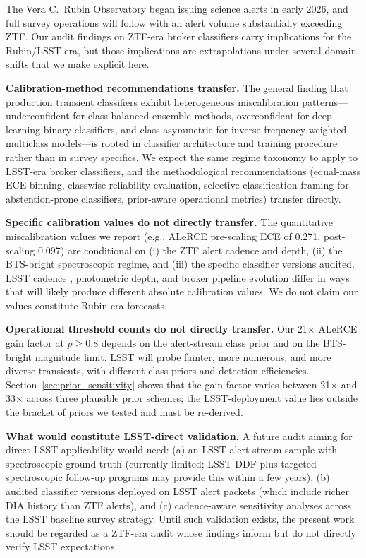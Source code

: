 \documentclass[twocolumn]{aastex631}
\begin{document}
The Vera C.\ Rubin Observatory began issuing science alerts in early 2026,
and full survey operations will follow with an alert volume substantially
exceeding ZTF. Our audit findings on ZTF-era broker classifiers carry
implications for the Rubin/LSST era, but those implications are
extrapolations under several domain shifts that we make explicit here.

\textbf{Calibration-method recommendations transfer.} The general
finding that production transient classifiers exhibit heterogeneous
miscalibration patterns---underconfident for class-balanced ensemble
methods, overconfident for deep-learning binary classifiers, and
class-asymmetric for inverse-frequency-weighted multiclass
models---is rooted in classifier architecture and training procedure
rather than in survey specifics. We expect the same regime taxonomy to
apply to LSST-era broker classifiers, and the methodological
recommendations (equal-mass ECE binning, classwise reliability
evaluation, selective-classification framing for abstention-prone
classifiers, prior-aware operational metrics) transfer directly.

\textbf{Specific calibration values do not directly transfer.} The
quantitative miscalibration values we report (e.g., ALeRCE pre-scaling
ECE of 0.271, post-scaling 0.097) are conditional on (i) the ZTF alert
cadence and depth, (ii) the BTS-bright spectroscopic regime, and (iii)
the specific classifier versions audited. LSST cadence
\citep{ivezic2019}, photometric depth, and broker pipeline
evolution \citep{moller2021,sanchezsaez2021} differ in ways that will
likely produce different absolute calibration values. We do not claim
our values constitute Rubin-era forecasts.

\textbf{Operational threshold counts do not directly transfer.} Our
21$\times$ ALeRCE gain factor at $p \geq 0.8$ depends on the
alert-stream class prior and on the BTS-bright magnitude limit.
LSST will probe fainter, more numerous, and more diverse transients,
with different class priors and detection efficiencies.
Section~\ref{sec:prior_sensitivity} shows that the gain factor varies
between 21$\times$ and 33$\times$ across three plausible prior schemes;
the LSST-deployment value lies outside the bracket of priors we tested
and must be re-derived.

\textbf{What would constitute LSST-direct validation.} A future audit
aiming for direct LSST applicability would need: (a) an LSST alert-stream
sample with spectroscopic ground truth (currently limited; LSST DDF plus
targeted spectroscopic follow-up programs may provide this within a few
years), (b) audited classifier versions deployed on LSST alert packets
(which include richer DIA history than ZTF alerts), and (c)
cadence-aware sensitivity analyses across the LSST baseline survey
strategy. Until such validation exists, the present work should be
regarded as a ZTF-era audit whose findings inform but do not directly
verify LSST expectations.
\end{document}
